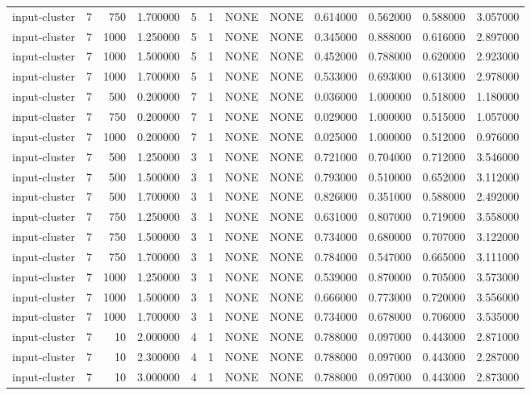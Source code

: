 \begin{tabular}{lrrrllllrrrr}
input-cluster & 7 & 750 & 1.700000 & 5 & 1 & NONE & NONE & 0.614000 & 0.562000 & 0.588000 & 3.057000 \\
input-cluster & 7 & 1000 & 1.250000 & 5 & 1 & NONE & NONE & 0.345000 & 0.888000 & 0.616000 & 2.897000 \\
input-cluster & 7 & 1000 & 1.500000 & 5 & 1 & NONE & NONE & 0.452000 & 0.788000 & 0.620000 & 2.923000 \\
input-cluster & 7 & 1000 & 1.700000 & 5 & 1 & NONE & NONE & 0.533000 & 0.693000 & 0.613000 & 2.978000 \\
input-cluster & 7 & 500 & 0.200000 & 7 & 1 & NONE & NONE & 0.036000 & 1.000000 & 0.518000 & 1.180000 \\
input-cluster & 7 & 750 & 0.200000 & 7 & 1 & NONE & NONE & 0.029000 & 1.000000 & 0.515000 & 1.057000 \\
input-cluster & 7 & 1000 & 0.200000 & 7 & 1 & NONE & NONE & 0.025000 & 1.000000 & 0.512000 & 0.976000 \\
input-cluster & 7 & 500 & 1.250000 & 3 & 1 & NONE & NONE & 0.721000 & 0.704000 & 0.712000 & 3.546000 \\
input-cluster & 7 & 500 & 1.500000 & 3 & 1 & NONE & NONE & 0.793000 & 0.510000 & 0.652000 & 3.112000 \\
input-cluster & 7 & 500 & 1.700000 & 3 & 1 & NONE & NONE & 0.826000 & 0.351000 & 0.588000 & 2.492000 \\
input-cluster & 7 & 750 & 1.250000 & 3 & 1 & NONE & NONE & 0.631000 & 0.807000 & 0.719000 & 3.558000 \\
input-cluster & 7 & 750 & 1.500000 & 3 & 1 & NONE & NONE & 0.734000 & 0.680000 & 0.707000 & 3.122000 \\
input-cluster & 7 & 750 & 1.700000 & 3 & 1 & NONE & NONE & 0.784000 & 0.547000 & 0.665000 & 3.111000 \\
input-cluster & 7 & 1000 & 1.250000 & 3 & 1 & NONE & NONE & 0.539000 & 0.870000 & 0.705000 & 3.573000 \\
input-cluster & 7 & 1000 & 1.500000 & 3 & 1 & NONE & NONE & 0.666000 & 0.773000 & 0.720000 & 3.556000 \\
input-cluster & 7 & 1000 & 1.700000 & 3 & 1 & NONE & NONE & 0.734000 & 0.678000 & 0.706000 & 3.535000 \\
input-cluster & 7 & 10 & 2.000000 & 4 & 1 & NONE & NONE & 0.788000 & 0.097000 & 0.443000 & 2.871000 \\
input-cluster & 7 & 10 & 2.300000 & 4 & 1 & NONE & NONE & 0.788000 & 0.097000 & 0.443000 & 2.287000 \\
input-cluster & 7 & 10 & 3.000000 & 4 & 1 & NONE & NONE & 0.788000 & 0.097000 & 0.443000 & 2.873000 \\

\end{tabular}
